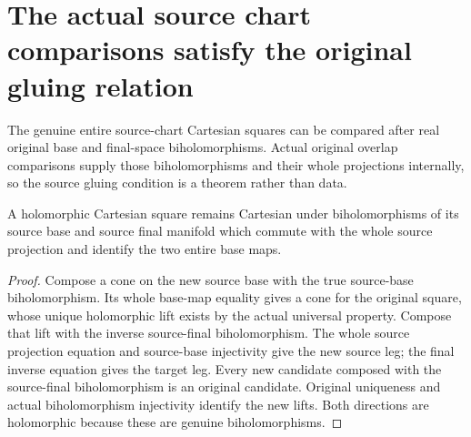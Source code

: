\section{The actual source chart comparisons satisfy the original gluing relation}

The genuine entire source-chart Cartesian squares can be compared after
real original base and final-space biholomorphisms. Actual original overlap
comparisons supply those biholomorphisms and their whole projections
internally, so the source gluing condition is a theorem rather than data.

\begin{lemma}
\label{hir:actual-cartesian-square-source-base-biholomorphic-transport}
\leanok
A holomorphic Cartesian square remains Cartesian under biholomorphisms of
its source base and source final manifold which commute with the whole
source projection and identify the two entire base maps.
\end{lemma}
\begin{proof}
Compose a cone on the new source base with the true source-base
biholomorphism. Its whole base-map equality gives a cone for the original
square, whose unique holomorphic lift exists by the actual universal
property. Compose that lift with the inverse source-final
biholomorphism. The whole source projection equation and source-base
injectivity give the new source leg; the final inverse equation gives
the target leg. Every new candidate composed with the source-final
biholomorphism is an original candidate. Original uniqueness and actual
biholomorphism injectivity identify the new lifts. Both directions are
holomorphic because these are genuine biholomorphisms.
\end{proof}

